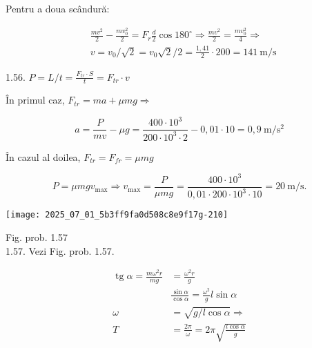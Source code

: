 Pentru a doua scândură:

$$
\begin{aligned}
& \frac{m v^{2}}{2}-\frac{m v_{0}^{2}}{2}=F_{r} \frac{d}{2} \cos 180^{\circ} \Rightarrow \frac{m v^{2}}{2}=\frac{m v_{0}^{2}}{4} \Rightarrow \\
& v=v_{0} / \sqrt{2}=v_{0} \sqrt{2} / 2=\frac{1,41}{2} \cdot 200=141 \mathrm{~m} / \mathrm{s}
\end{aligned}
$$

1.56. $P=L / t=\frac{F_{t r} \cdot S}{t}=F_{t r} \cdot v$

În primul caz, $F_{t r}=m a+\mu m g \Rightarrow$

$$
a=\frac{P}{m v}-\mu g=\frac{400 \cdot 10^{3}}{200 \cdot 10^{3} \cdot 2}-0,01 \cdot 10=0,9 \mathrm{~m} / \mathrm{s}^{2}
$$

În cazul al doilea, $F_{t r}=F_{f r}=\mu m g$

$$
P=\mu m g v_{\max } \Rightarrow v_{\max }=\frac{P}{\mu m g}=\frac{400 \cdot 10^{3}}{0,01 \cdot 200 \cdot 10^{3} \cdot 10}=20 \mathrm{~m} / \mathrm{s} .
$$

\begin{center}
\texttt{[image: 2025\_07\_01\_5b3ff9fa0d508c8e9f17g-210]}
\end{center}

Fig. prob. 1.57\\
1.57. Vezi Fig. prob. 1.57.

$$
\begin{aligned}
\operatorname{tg} \alpha=\frac{m \omega^{2} r}{m g} & =\frac{\omega^{2} r}{g} \\
& \frac{\sin \alpha}{\cos \alpha}=\frac{\omega^{2}}{g} l \sin \alpha \\
\omega & =\sqrt{g / l \cos \alpha} \Rightarrow \\
T & =\frac{2 \pi}{\omega}=2 \pi \sqrt{\frac{l \cos \alpha}{g}}
\end{aligned}
$$

